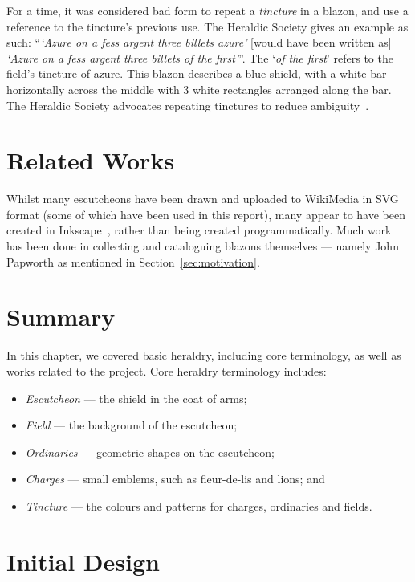 \documentclass[nobib, a4paper, twoside, justified]{tufte-book}
\begin{document}
For a time, it was considered bad form to repeat a \textit{tincture} in a blazon, and use a
reference to the tincture's previous use. The Heraldic Society gives an example as such:
``\textit{`Azure on a fess argent three billets azure'} [would have been written as] \textit{`Azure
on a fess argent three billets of the first'}''. The `\textit{of the first}' refers to the field's
tincture of azure. This blazon describes a blue shield, with a white bar horizontally across the
middle with 3 white rectangles arranged along the bar. The Heraldic Society advocates repeating
tinctures to reduce ambiguity~\autocite{blazon_in_coa}.

\section{Related Works}%
\label{sec:related_works}

Whilst many escutcheons have been drawn and uploaded to WikiMedia in SVG format (some of which have
been used in this report), many appear to have been created in
Inkscape~, rather than being created programmatically.
Much work has been done in collecting and cataloguing blazons themselves --- namely John Papworth
as mentioned in Section~\ref{sec:motivation}.

\section{Summary}%
\label{sec:background_summary}

In this chapter, we covered basic heraldry, including core terminology, as well as works related to
the project. Core heraldry terminology includes:

\begin{itemize}
  \item \textit{Escutcheon} --- the shield in the coat of arms;
  \item \textit{Field} --- the background of the escutcheon;
  \item \textit{Ordinaries} --- geometric shapes on the escutcheon;
  \item \textit{Charges} --- small emblems, such as fleur-de-lis and lions; and
  \item \textit{Tincture} --- the colours and patterns for charges, ordinaries and fields.
\end{itemize}

\section{Initial Design}%
\label{sec:initial_design}
\end{document}
